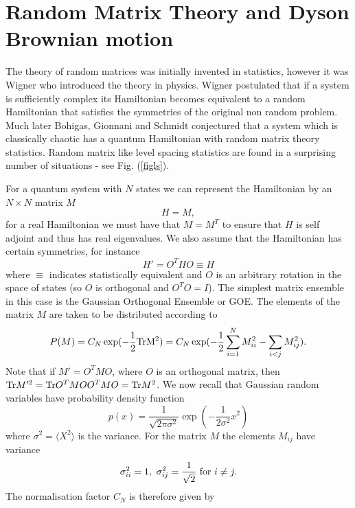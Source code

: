 \documentclass[11pt]{report}
\begin{document}
\section{Random Matrix Theory and Dyson Brownian motion}
The theory of random matrices was initially invented in statistics, however it was Wigner who introduced the theory in physics. Wigner postulated that if a system is sufficiently complex its Hamiltonian becomes equivalent to a random Hamiltonian that satisfies the symmetries of the original non random problem. Much later Bohigas, Gionnani and Schmidt conjectured that a system which is classically chaotic has a quantum Hamiltonian with random matrix theory statistics. Random matrix like level spacing statistics are found in a surprising number of situations - see Fig. (\ref{figls}).

For a quantum system with $N$ states we can represent the Hamiltonian by an $N\times N$ matrix $M$
\begin{equation}
H = M,
\end{equation}
for a real Hamiltonian we must have that 
$M=M^T$ to ensure that $H$ is self adjoint and thus has real eigenvalues.
We also assume that the Hamiltonian has certain symmetries, for instance
\begin{equation}
H'= O^THO \equiv H
\end{equation}
where $\equiv$ indicates statistically equivalent and $O$ is an arbitrary rotation in the space of states (so $O$ is orthogonal and $O^TO=I$). The simplest matrix ensemble in this case is
the Gaussian Orthogonal Ensemble or GOE. The elements of the matrix $M$ are taken to be distributed according to
\begin{equation}
P(M)= C_N \exp(-\frac{1}{2}{\rm Tr M^2}) = C_N\exp(-\frac{1}{2}\sum_{i=1}^N M_{ii}^2 - \sum_{i<j}M_{ij}^2).
\end{equation}
Note that if $M'= O^T M O$, where $O$ is an orthogonal matrix, then  ${\rm Tr} M'^2 =  {\rm Tr} O^TMOO^TMO ={\rm Tr} M^2$. We now recall that Gaussian random variables have probability density function
\begin{equation}
p(x) =\frac{1}{\sqrt{2\pi \sigma^2}}\exp(-\frac{1}{2\sigma^2}x^2)
\end{equation}
where $\sigma^2 =\langle X^2\rangle$ is the variance. For the matrix $M$ the elements $M_{ij}$ have variance
\begin{equation}
\sigma_{ii}^2 = 1, \ \sigma_{ij}^2 =\frac{1}{\sqrt{2}} \ {\rm for}\ i\neq j.
\end{equation}
The normalisation factor $C_N$ is therefore given by
\end{document}
